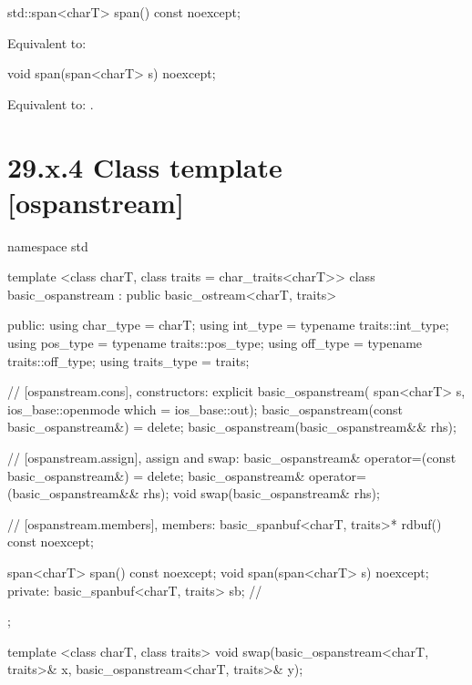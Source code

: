 \documentclass[ebook,11pt,article]{memoir}
\renewcommand{\iref}[1]{[#1]}
\begin{document}
\begin{itemdecl}
std::span<charT> span() const noexcept;
\end{itemdecl}

\begin{itemdescr}
\pnum
\effects Equivalent to:\\
\end{itemdescr}

\begin{itemdecl}
void span(span<charT> s) noexcept;
\end{itemdecl}

\begin{itemdescr}
\pnum
\effects
Equivalent to:
.
\end{itemdescr}

\section{29.x.4 Class template  [ospanstream] }

\begin{codeblock}
namespace std {
  template <class charT, class traits = char_traits<charT>>
  class basic_ospanstream
    : public basic_ostream<charT, traits> {
  public:
    using char_type      = charT;
    using int_type       = typename traits::int_type;
    using pos_type       = typename traits::pos_type;
    using off_type       = typename traits::off_type;
    using traits_type    = traits;

    // \iref{ospanstream.cons}, constructors:
    explicit basic_ospanstream(
      span<charT> s,
      ios_base::openmode which = ios_base::out);
    basic_ospanstream(const basic_ospanstream&) = delete;
    basic_ospanstream(basic_ospanstream&& rhs);

    // \iref{ospanstream.assign}, assign and swap:
    basic_ospanstream& operator=(const basic_ospanstream&) = delete;
    basic_ospanstream& operator=(basic_ospanstream&& rhs);
    void swap(basic_ospanstream& rhs);

    // \iref{ospanstream.members}, members:
    basic_spanbuf<charT, traits>* rdbuf() const noexcept;

    span<charT> span() const noexcept;
    void span(span<charT> s) noexcept;
  private:
    basic_spanbuf<charT, traits> sb; // \expos
  };

  template <class charT, class traits>
    void swap(basic_ospanstream<charT, traits>& x,
              basic_ospanstream<charT, traits>& y);
}
\end{codeblock}
\end{document}
